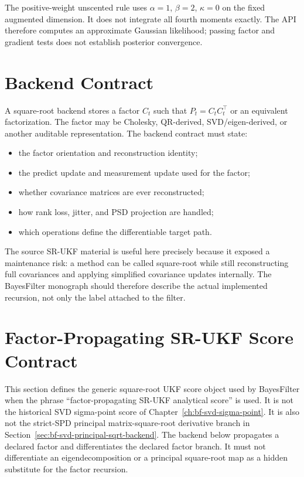 The positive-weight unscented rule uses $\alpha=1$, $\beta=2$, $\kappa=0$
on the fixed augmented dimension. It does not integrate all fourth moments
exactly. The API therefore computes an approximate Gaussian likelihood;
passing factor and gradient tests does not establish posterior convergence.

\section{Backend Contract}
\label{sec:bf-square-root-contract}

A square-root backend stores a factor $C_t$ such that
$P_t=C_tC_t^\top$ or an equivalent factorization.  The factor may be Cholesky,
QR-derived, SVD/eigen-derived, or another auditable representation.  The
backend contract must state:
\begin{itemize}
  \item the factor orientation and reconstruction identity;
  \item the predict update and measurement update used for the factor;
  \item whether covariance matrices are ever reconstructed;
  \item how rank loss, jitter, and PSD projection are handled;
  \item which operations define the differentiable target path.
\end{itemize}

The source SR-UKF material is useful here precisely because it exposed a
maintenance risk: a method can be called square-root while still reconstructing
full covariances and applying simplified covariance updates internally.  The
BayesFilter monograph should therefore describe the actual implemented
recursion, not only the label attached to the filter.

\section{Factor-Propagating SR-UKF Score Contract}
\label{sec:bf-srukf-factor-propagating-score-contract}

This section defines the generic square-root UKF score object used by
BayesFilter when the phrase ``factor-propagating SR-UKF analytical score'' is
used.  It is not the historical SVD sigma-point score of
Chapter~\ref{ch:bf-svd-sigma-point}.  It is also not the strict-SPD principal
matrix-square-root derivative branch in
Section~\ref{sec:bf-svd-principal-sqrt-backend}.  The backend below propagates a
declared factor and differentiates the declared factor branch.  It must not
differentiate an eigendecomposition or a principal square-root map as a hidden
substitute for the factor recursion.

